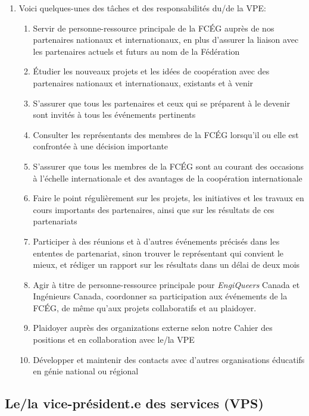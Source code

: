 \begin{enumerate}
 \item
  Voici quelques-unes des tâches et des responsabilités du/de la VPE:
  \begin{enumerate}
   \item
    Servir de personne-ressource principale de la FCÉG auprès de nos partenaires nationaux et internationaux, en plus d'assurer la liaison avec les partenaires actuels et futurs au nom de la Fédération
   \item
    Étudier les nouveaux projets et les idées de coopération avec des partenaires nationaux et internationaux, existants et à venir
   \item
    S'assurer que tous les partenaires et ceux qui se préparent à le devenir sont invités à tous les événements pertinents
   \item
    Consulter les représentants des membres de la FCÉG lorsqu'il ou elle est confrontée à une décision importante
   \item
    S'assurer que tous les membres de la FCÉG sont au courant des occasions à l'échelle internationale et des avantages de la coopération internationale
   \item
    Faire le point régulièrement sur les projets, les initiatives et les travaux en cours importants des partenaires, ainsi que sur les résultats de ces partenariats
   \item
    Participer à des réunions et à d'autres événements précisés dans les ententes de partenariat, sinon trouver le représentant qui convient le mieux, et rédiger un rapport sur les résultats dans un délai de deux mois
   \item
    Agir à titre de personne-ressource principale pour \emph{EngiQueers} Canada et Ingénieurs Canada, coordonner sa participation aux événements de la FCÉG, de même qu'aux projets collaboratifs et au plaidoyer.
   \item
    Plaidoyer auprès des organizations externe selon notre Cahier des positions et en collaboration avec le/la VPE
   \item
    Développer et maintenir des contacts avec d'autres organisations éducatifs en génie national ou régional
  \end{enumerate}
\end{enumerate}

\subsection{Le/la vice-président.e des services (VPS)}
\label{le-la-vice-president-e-des-services-vps}

